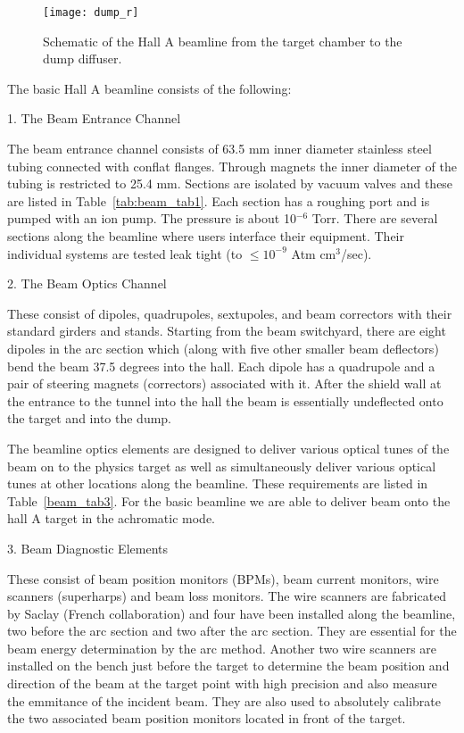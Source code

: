 \begin{figure}
\begin{center}
\texttt{[image: dump\_r]}
{\linespread{1.}
\caption[Beamline: Hall A Beamline Overview]{Schematic of the Hall A beamline
from the target chamber to the dump diffuser.}
\label{fig:Aline3}}
\end{center}
\end{figure}
The basic Hall A beamline consists of the following:

\vskip 0.5cm
1. The Beam Entrance Channel

The beam entrance channel consists of 63.5 mm inner diameter stainless steel 
tubing connected with conflat flanges. Through magnets the inner diameter of the 
tubing is restricted to 25.4 mm. Sections are isolated by vacuum valves and these are listed 
in Table~\ref{tab:beam_tab1}. Each section has a roughing port and is pumped with an ion pump. 
The pressure is about 10$^{-6}$ Torr. There are several sections along the 
beamline where users interface their equipment. Their individual systems 
are tested leak tight (to $ \le 10^{-9}$ Atm cm$^3$/sec).

\vskip 0.5cm
2. The Beam Optics Channel

These consist of dipoles, quadrupoles, sextupoles, and 
beam correctors with their 
standard girders and stands. Starting from the beam switchyard, there are 
eight dipoles in the arc section which (along with five  other smaller beam 
deflectors) bend the beam 37.5 degrees into the hall. Each dipole has a 
quadrupole and a pair of steering magnets (correctors) associated with it. 
After the shield wall at the entrance to the tunnel into the hall the beam is 
essentially undeflected onto the target and into the dump.  

The beamline optics elements are designed to deliver 
various optical tunes of the beam on to the physics target as well as 
simultaneously deliver various optical tunes at other locations along the 
beamline. These requirements are listed in Table~\ref{beam_tab3}. For the basic beamline we 
are able to deliver beam onto the hall A target in the achromatic
mode. 
 
\vskip 0.5cm
3. Beam Diagnostic Elements

These consist of beam position monitors (BPMs), beam current monitors,  wire 
scanners (superharps) and beam loss monitors. 
The wire scanners are fabricated by Saclay (French 
collaboration) and four have been installed along the beamline, two before 
the arc section and two after the arc section. They are essential for the 
beam energy determination by the arc method. Another two wire scanners are
installed on the bench just before the target to determine the beam 
position and direction of the beam at the target point with high precision 
and also measure the emmitance of the incident beam. They are also used to  
absolutely calibrate the two associated beam position monitors located  in 
front of the target. 


